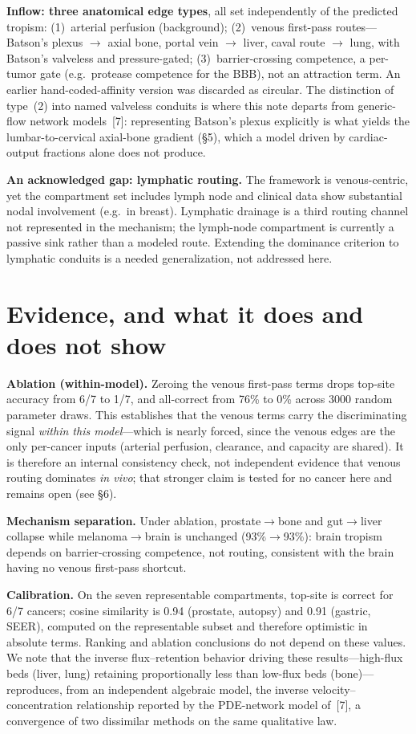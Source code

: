\documentclass[11pt]{article}
\begin{document}
\textbf{Inflow: three anatomical edge types}, all set independently of the
predicted tropism: (1)~arterial perfusion (background); (2)~venous first-pass
routes---Batson's plexus $\to$ axial bone, portal vein $\to$ liver, caval route
$\to$ lung, with Batson's valveless and pressure-gated; (3)~barrier-crossing
competence, a per-tumor gate (e.g.\ protease competence for the BBB), not an
attraction term. An earlier hand-coded-affinity version was discarded as circular. The distinction of
type~(2) into named valveless conduits is where this note departs from generic-flow
network models~[7]: representing Batson's plexus explicitly is what yields the
lumbar-to-cervical axial-bone gradient (\S5), which a model driven by cardiac-output
fractions alone does not produce.

\textbf{An acknowledged gap: lymphatic routing.} The framework is venous-centric,
yet the compartment set includes lymph node and clinical data show substantial
nodal involvement (e.g.\ in breast). Lymphatic drainage is a third routing channel
not represented in the mechanism; the lymph-node compartment is currently a
passive sink rather than a modeled route. Extending the dominance criterion to
lymphatic conduits is a needed generalization, not addressed here.

\section{Evidence, and what it does and does not show}

\textbf{Ablation (within-model).} Zeroing the venous first-pass terms drops
top-site accuracy from 6/7 to 1/7, and all-correct from 76\% to 0\% across 3000
random parameter draws. This establishes that the venous terms carry the
discriminating signal \emph{within this model}---which is nearly forced, since the
venous edges are the only per-cancer inputs (arterial perfusion, clearance, and
capacity are shared). It is therefore an internal consistency check, not
independent evidence that venous routing dominates \emph{in vivo}; that stronger
claim is tested for no cancer here and remains open (see \S6).

\textbf{Mechanism separation.} Under ablation, prostate$\to$bone and gut$\to$liver
collapse while melanoma$\to$brain is unchanged (93\%$\to$93\%): brain tropism
depends on barrier-crossing competence, not routing, consistent with the brain
having no venous first-pass shortcut.

\textbf{Calibration.} On the seven representable compartments, top-site is correct
for 6/7 cancers; cosine similarity is 0.94 (prostate, autopsy) and 0.91 (gastric,
SEER), computed on the representable subset and therefore optimistic in absolute
terms. Ranking and ablation conclusions do not depend on these values. We note that the
inverse flux--retention behavior driving these results---high-flux beds (liver, lung)
retaining proportionally less than low-flux beds (bone)---reproduces, from an
independent algebraic model, the inverse velocity--concentration relationship
reported by the PDE-network model of~[7], a convergence of two dissimilar methods on
the same qualitative law.
\end{document}
